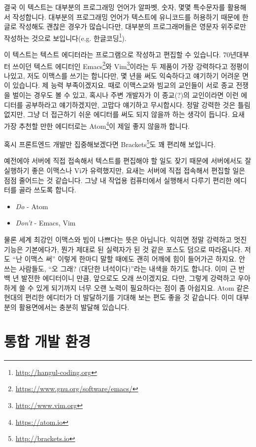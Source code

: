 \documentclass[11pt,a4paper]{article}
\begin{document}
결국 이 텍스트는 대부분의 프로그래밍 언어가 알파벳, 숫자, 몇몇 특수문자를 활용해서 작성합니다. 대부분의 프로그래밍 언어가 텍스트에 유니코드를 허용하기 때문에 한글로 작성해도 괜찮은 경우가 많습니다만, 대부분의 프로그래머들은 영문자 위주로만 작성하는 것으로 보입니다(e.g. 한글코딩\footnote{\url{http://hangul-coding.org}}).

이 텍스트는 텍스트 에디터라는 프로그램으로 작성하고 편집할 수 있습니다. 70년대부터 쓰이던 텍스트 에디터인 Emacs\footnote{\url{https://www.gnu.org/software/emacs/}}와 Vim\footnote{\url{http://www.vim.org}}이라는 두 제품이 가장 강력하다고 정평이 나있고, 저도 이맥스를 쓰기는 합니다만, 몇 년을 써도 익숙하다고 얘기하기 어려운 면이 있습니다. 제 능력 부족이겠지요. 때로 이맥스교와 빔교의 교인들이 서로 종교 전쟁을 벌이는 경우도 볼 수 있고, 혹시나 주변 개발자가 이 종교(?)의 교인이라면 이런 에디터를 공부하라고 얘기하겠지만, 고맙다 얘기하고 무시합시다. 정말 강력한 것은 틀림없지만, 그냥 더 접근하기 쉬운 에디터를 써도 되지 않을까 하는 생각이 듭니다. 요새 가장 추천할 만한 에디터로는 Atom\footnote{\url{https://atom.io}}이 제일 좋지 않을까 합니다.

혹시 프론트엔드 개발만 집중해보겠다면 Brackets\footnote{\url{http://brackets.io}}도 꽤 편리해 보입니다.

예전에야 서버에 직접 접속해서 텍스트를 편집해야 할 일도 잦기 때문에 서버에서도 잘 실행하기 좋은 이맥스나 Vi가 유력했지만, 요새는 서버에 직접 접속해서 편집할 일은 점점 줄어드는 것 같습니다. 그냥 내 작업용 컴퓨터에서 실행해서 다루기 편리한 에디터를 골라 쓰도록 합니다.

\begin{itemize}
\item \emph{Do} - Atom
\item \emph{Don't} - Emacs, Vim
\end{itemize}

물론 세계 최강인 이맥스와 빔이 나쁘다는 뜻은 아닙니다. 익히면 정말 강력하고 멋진 기능은 기본에다가, 뭔가 제대로 된 실력자가 된 것 같은 포스도 덤으로 따라옵니다.  저도 ``난 이맥스 써'' 이렇게 한마디 말할 때에도 괜히 어깨에 힘이 들어가곤 하지요. 안 쓰는 사람들도, ``오 그래? (대단한 녀석이다)''라는 내색을 하기도 합니다. 이미 근 반 백 년 발전한 에디터이니 만큼, 앞으로도 오래 쓰이겠지요. 다만, 그렇게 강력하고 우아하게 쓸 수 있게 되기까지 너무 오랜 노력이 필요하다는 점이 좀 아쉽지요. Atom 같은 현대의 편리한 에디터가 더 발달하기를 기대해 보는 편도 좋을 것 같습니다. 이미 대부분의 활용면에서는 충분히 발달해 있습니다.

\section{통합 개발 환경}
\end{document}
